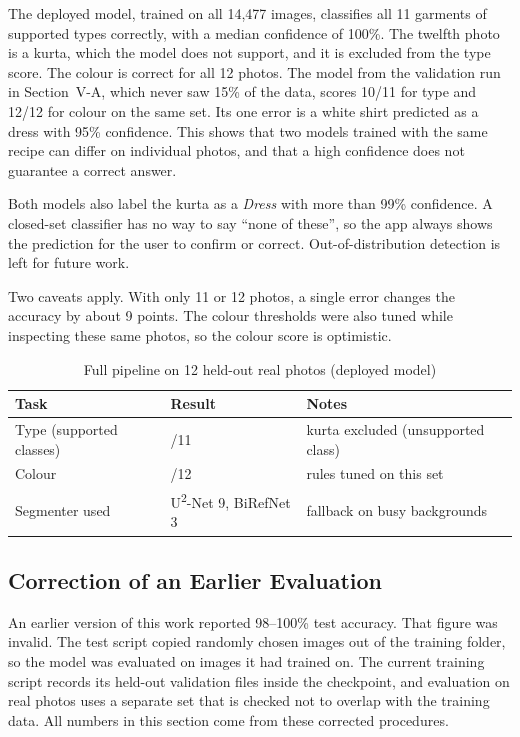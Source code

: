 \documentclass[conference]{IEEEtran}
\begin{document}
The deployed model, trained on all 14{,}477 images, classifies all 11 garments of supported types correctly, with a median confidence of 100\%. The twelfth photo is a kurta, which the model does not support, and it is excluded from the type score. The colour is correct for all 12 photos. The model from the validation run in Section~V-A, which never saw 15\% of the data, scores 10/11 for type and 12/12 for colour on the same set. Its one error is a white shirt predicted as a dress with 95\% confidence. This shows that two models trained with the same recipe can differ on individual photos, and that a high confidence does not guarantee a correct answer.

Both models also label the kurta as a \emph{Dress} with more than 99\% confidence. A closed-set classifier has no way to say ``none of these'', so the app always shows the prediction for the user to confirm or correct. Out-of-distribution detection is left for future work.

Two caveats apply. With only 11 or 12 photos, a single error changes the accuracy by about 9 points. The colour thresholds were also tuned while inspecting these same photos, so the colour score is optimistic.

\begin{table}[t]
\caption{Full pipeline on 12 held-out real photos (deployed model)}
\label{tab:holdout}
\centering
\begin{tabular}{>{\raggedright\arraybackslash}p{2.4cm}>{\raggedright\arraybackslash}p{2.2cm}>{\raggedright\arraybackslash}p{2.6cm}}
\toprule
Task & Result & Notes \\
\midrule
Type (supported classes) & 11/11 & 1 kurta excluded (unsupported class) \\
Colour & 12/12 & rules tuned on this set \\
Segmenter used & U\textsuperscript{2}-Net 9, BiRefNet 3 & fallback on busy backgrounds \\
\bottomrule
\end{tabular}
\end{table}

\subsection{Correction of an Earlier Evaluation}
An earlier version of this work reported 98--100\% test accuracy. That figure was invalid. The test script copied randomly chosen images out of the training folder, so the model was evaluated on images it had trained on. The current training script records its held-out validation files inside the checkpoint, and evaluation on real photos uses a separate set that is checked not to overlap with the training data. All numbers in this section come from these corrected procedures.
\end{document}
